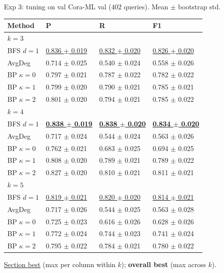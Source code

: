 \documentclass{beamer}
\begin{document}
\begin{frame}{Exp 3: tuning on val}
  Cora-ML val ($402$ queries). Mean $\pm$ bootstrap std.

  \tiny
  \begin{center}
  \begin{tabular}{llll}
    \toprule
    Method                       & P     & R     & F1 \\
    \midrule
    \multicolumn{4}{l}{\textit{$k = 3$}} \\
    BFS $d = 1$                  & \underline{0.836 $\pm$ 0.019} & \underline{0.832 $\pm$ 0.020} & \underline{0.826 $\pm$ 0.020} \\
    AvgDeg                       & 0.714 $\pm$ 0.025 & 0.540 $\pm$ 0.024 & 0.558 $\pm$ 0.026 \\
    BP $\kappa = 0$              & 0.797 $\pm$ 0.021 & 0.787 $\pm$ 0.022 & 0.782 $\pm$ 0.022 \\
    BP $\kappa = 1$              & 0.799 $\pm$ 0.020 & 0.790 $\pm$ 0.021 & 0.785 $\pm$ 0.021 \\
    BP $\kappa = 2$              & 0.801 $\pm$ 0.020 & 0.794 $\pm$ 0.021 & 0.785 $\pm$ 0.022 \\
    \midrule
    \multicolumn{4}{l}{\textit{$k = 4$}} \\
    BFS $d = 1$                  & \underline{\textbf{0.838 $\pm$ 0.019}} & \underline{\textbf{0.838 $\pm$ 0.020}} & \underline{\textbf{0.834 $\pm$ 0.020}} \\
    AvgDeg                       & 0.717 $\pm$ 0.024 & 0.544 $\pm$ 0.024 & 0.563 $\pm$ 0.026 \\
    BP $\kappa = 0$              & 0.762 $\pm$ 0.021 & 0.683 $\pm$ 0.025 & 0.694 $\pm$ 0.025 \\
    BP $\kappa = 1$              & 0.808 $\pm$ 0.020 & 0.789 $\pm$ 0.021 & 0.789 $\pm$ 0.022 \\
    BP $\kappa = 2$              & 0.827 $\pm$ 0.020 & 0.810 $\pm$ 0.021 & 0.811 $\pm$ 0.021 \\
    \midrule
    \multicolumn{4}{l}{\textit{$k = 5$}} \\
    BFS $d = 1$                  & \underline{0.819 $\pm$ 0.021} & \underline{0.820 $\pm$ 0.020} & \underline{0.814 $\pm$ 0.021} \\
    AvgDeg                       & 0.717 $\pm$ 0.026 & 0.544 $\pm$ 0.025 & 0.563 $\pm$ 0.028 \\
    BP $\kappa = 0$              & 0.725 $\pm$ 0.023 & 0.616 $\pm$ 0.026 & 0.628 $\pm$ 0.026 \\
    BP $\kappa = 1$              & 0.772 $\pm$ 0.024 & 0.744 $\pm$ 0.023 & 0.741 $\pm$ 0.024 \\
    BP $\kappa = 2$              & 0.795 $\pm$ 0.022 & 0.784 $\pm$ 0.021 & 0.780 $\pm$ 0.022 \\
    \bottomrule
  \end{tabular}
  \end{center}

  \scriptsize \underline{Section best} (max per column within $k$); \textbf{overall best} (max across $k$).
\end{frame}
\end{document}
